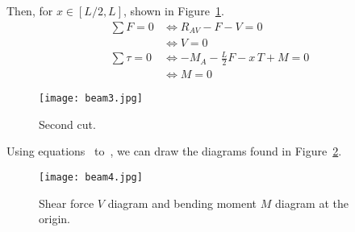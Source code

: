 Then, for $x \in [L/2, L]$, shown in Figure~\ref{fig:beam_3}.
\begin{align}
  \sum F = 0 &\iff R_{AV} - F - V = 0 \nonumber \\
  &\iff V = 0 \label{eq:beam_V_cut2}\\
  \sum \tau = 0 &\iff -M_A -\frac{L}{2} F - x \, T + M = 0 \nonumber \\
  &\iff M = 0 \label{eq:beam_M_cut2}
\end{align}

\begin{figure}[h]
  \begin{center}
    \texttt{[image: beam3.jpg]}
    \caption{Second cut.}
    \label{fig:beam_3}
  \end{center}
\end{figure}

Using equations~ to~,
we can draw the diagrams found in Figure~\ref{fig:beam_4}.
\begin{figure}[h]
  \begin{center}
    \texttt{[image: beam4.jpg]}
    \caption{Shear force $V$ diagram and bending moment $M$ diagram
    at the origin.}
    \label{fig:beam_4}
  \end{center}
\end{figure}